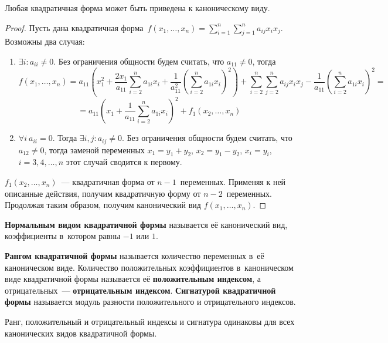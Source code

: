 \begin{theorem}
Любая квадратичная форма может быть приведена к каноническому виду.
\end{theorem}
\begin{proof}
Пусть дана квадратичная форма~$f(x_1, \ldots, x_n) = \sum\limits_{i=1}^n \sum\limits_{j=1}^n a_{ij} x_i x_j$.
Возможны два случая:
\begin{enumerate}
	\item $\exists i \colon a_{ii} \neq 0$.
	Без ограничения общности будем считать, что $a_{11} \neq 0$, тогда
	\begin{equation*}
	f(x_1, \ldots, x_n) = a_{11}\left( x_1^2 + \frac{2 x_1}{a_{11}} \sum_{i=2}^n a_{1i} x_i + \frac1{a_{11}^2} \left( \sum_{i=2}^n a_{1i} x_i \right)^2 \right) + \sum_{i=2}^n \sum_{j=2}^n a_{ij} x_i x_j - \frac1{a_{11}} \left( \sum_{i=2}^n a_{1i} x_i \right)^2 =
	\end{equation*}
	\begin{equation*}
	= a_{11}\left( x_1 + \frac1{a_{11}} \sum_{i=2}^n a_{1i} x_i \right)^2 + f_1(x_2, \ldots, x_n)
	\end{equation*}
	
	\item $\forall i \ a_{ii} = 0$.
	Тогда $\exists i, j \colon a_{ij} \neq 0$.
	Без ограничения общности будем считать, что $a_{12} \neq 0$, тогда заменой переменных $x_1 = y_1 + y_2$, $x_2 = y_1 - y_2$, $x_i = y_i$, $i = 3, 4, \ldots, n$ этот случай сводится к первому.
\end{enumerate}

$f_1(x_2, \ldots, x_n)$~--- квадратичная форма от $n - 1$~переменных.
Применяя к ней описанные действия, получим квадратичную форму от $n - 2$~переменных.
Продолжая таким образом, получим канонический вид $f(x_1, \ldots, x_n)$.
\end{proof}

\textbf{Нормальным видом квадратичной формы} называется её канонический вид, коэффициенты в~котором равны $-1$ или $1$.

\textbf{Рангом квадратичной формы} называется количество переменных в~её каноническом виде.
Количество положительных коэффициентов в~каноническом виде квадратичной формы называется её \textbf{положительным индексом}, а отрицательных~--- \textbf{отрицательным индексом}.
\textbf{Сигнатурой квадратичной формы} называется модуль разности положительного и отрицательного индексов.

Ранг, положительный и отрицательный индексы и сигнатура одинаковы для всех канонических видов квадратичной формы.